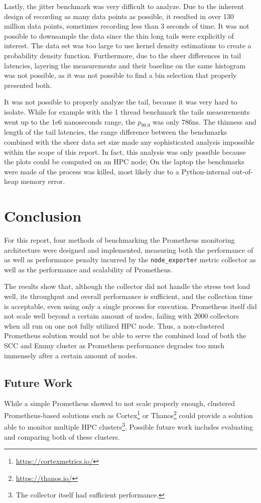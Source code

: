 Lastly, the jitter benchmark was very difficult to analyze. Due to the inherent design of recording as many data points as possible, it resulted in over 130 million data points, sometimes recording less than 3 seconds of time. It was not possible to downsample the data since the thin long tails were explicitly of interest. The data set was too large to use kernel density estimations to create a probability density function. Furthermore, due to the sheer differences in tail latencies, layering the measurements and their baseline on the same histogram was not possible, as it was not possible to find a bin selection that properly presented both.

It was not possible to properly analyze the tail, because it was very hard to isolate. While for example with the 1 thread benchmark the tails measurements went up to the 1e6 nanoseconds range, the $p_{99.9}$ was only $786$ns. The thinness and length of the tail latencies, the range difference between the benchmarks combined with the sheer data set size made any sophisticated analysis impossible within the scope of this report. In fact, this analysis was only possible because the plots could be computed on an \ac{HPC} node; On the laptop the benchmarks were made of the process was killed, most likely due to a Python-internal out-of-heap memory error.

\section{Conclusion}
For this report, four methods of benchmarking the Prometheus monitoring architecture were designed and implemented, measuring both the performance of as well as performance penalty incurred by the \texttt{node\_exporter} metric collector as well as the performance and scalability of Prometheus.

The results show that, although the collector did not handle the stress test load well, its throughput and overall performance is sufficient, and the collection time is acceptable, even using only a single process for execution. Prometheus itself did not scale well beyond a certain amount of nodes, failing with 2000 collectors when all run on one not fully utilized \ac{HPC} node. Thus, a non-clustered Prometheus solution would not be able to serve the combined load of both the SCC and Emmy cluster as Prometheus performance degrades too much immensely after a certain amount of nodes.

\subsection{Future Work}
While a simple Prometheus showed to not scale properly enough, clustered Prometheus-based solutions such as Cortex\footnote{\url{https://cortexmetrics.io/}} or Thanos\footnote{\url{https://thanos.io/}} could provide a solution able to monitor multiple \ac{HPC} clusters\footnote{The collector itself had sufficient performance.}. Possible future work includes evaluating and comparing both of these clusters.

